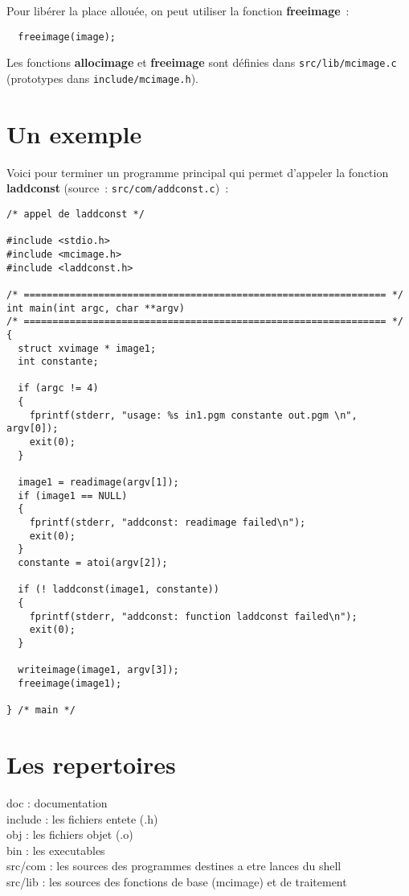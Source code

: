 Pour lib\'erer la place allou\'ee, on peut utiliser la fonction
{\bf freeimage}~:

\begin{verbatim}
  freeimage(image);
\end{verbatim}

Les fonctions {\bf allocimage} et {\bf freeimage} sont d\'efinies
dans \verb|src/lib/mcimage.c| (prototypes dans \verb|include/mcimage.h|).

\section{Un exemple}

Voici pour terminer un programme principal qui permet 
d'appeler la fonction {\bf laddconst} (source~: \verb|src/com/addconst.c|)~:

\begin{verbatim}
/* appel de laddconst */

#include <stdio.h>
#include <mcimage.h>
#include <laddconst.h>

/* =============================================================== */
int main(int argc, char **argv) 
/* =============================================================== */
{
  struct xvimage * image1;
  int constante;

  if (argc != 4)
  {
    fprintf(stderr, "usage: %s in1.pgm constante out.pgm \n", argv[0]);
    exit(0);
  }

  image1 = readimage(argv[1]);  
  if (image1 == NULL)
  {
    fprintf(stderr, "addconst: readimage failed\n");
    exit(0);
  }
  constante = atoi(argv[2]);

  if (! laddconst(image1, constante))
  {
    fprintf(stderr, "addconst: function laddconst failed\n");
    exit(0);
  }

  writeimage(image1, argv[3]);
  freeimage(image1);

} /* main */
\end{verbatim}

\section{Les repertoires}

doc      : documentation\\
include  : les fichiers entete (.h)\\
obj      : les fichiers objet (.o)\\
bin      : les executables\\
src/com  : les sources des programmes destines a etre lances du shell\\
src/lib  : les sources des fonctions de base (mcimage) et de traitement

